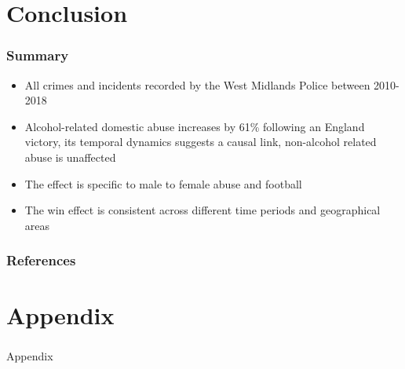 \documentclass[hyperref={pdfpagelabels=false}]{beamer}
\begin{document}
\section{Conclusion}

\begin{frame}
\frametitle{Summary}
\begin{itemize}
\item All crimes and incidents recorded by the West Midlands Police between 2010-2018
\item Alcohol-related domestic abuse increases by 61\% following an England victory, its temporal dynamics suggests a causal link, non-alcohol related abuse is unaffected
\item The effect is specific to male to female abuse and football 
\item The win effect is consistent across different time periods and geographical areas

\end{itemize}
\end{frame}


\begin{frame}[shrink=20]{}
\frametitle{References}


\end{frame}

\section{Appendix}

\begin{frame}
\frametitle{}
\begin{center}
\huge Appendix
\end{center}
\end{frame}
\end{document}
